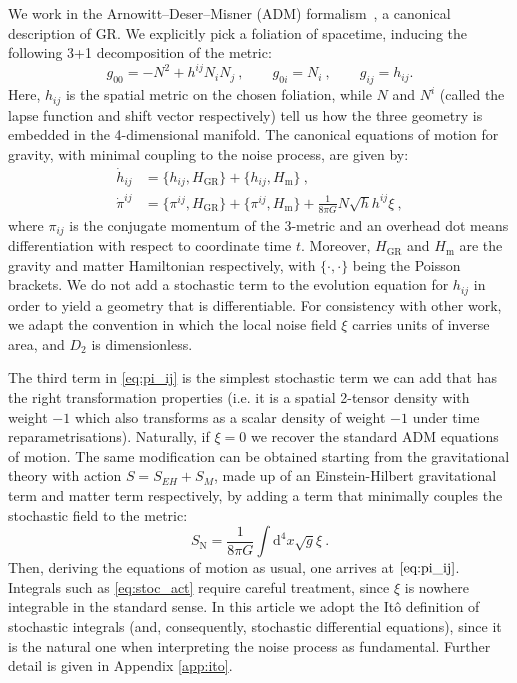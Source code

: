 \documentclass[amsmath,amssymb,11pt]{article}
\begin{document}
We work in the Arnowitt–Deser–Misner (ADM) formalism~\cite{arnowitt1959dynamical}, a canonical description of GR. We explicitly pick a foliation of spacetime, inducing the following 3+1 decomposition of the metric:
\begin{equation}
    g_{00}=-N^2+h^{ij}N_i N_j \ , \qquad g_{0i}=N_i \ , \qquad g_{ij}= h_{ij} .
\end{equation}
Here, $h_{ij}$ is the spatial metric on the chosen foliation, while $N$ and $N^i$ (called the lapse function and shift vector respectively) tell us how the three geometry is embedded in the 4-dimensional manifold. The canonical equations of motion for gravity, with minimal coupling to the noise process, are given by:
\begin{align}
    \dot{h}_{ij} &= \{h_{ij}, H_{\text{GR}}\}+ \{h_{ij}, H_{\text{m}} \}  \   ,\\
    \dot{\pi}^{ij} &= \{\pi^{ij}, H_{\text{GR}}\}+ \{\pi^{ij}, H_{\text{m}}\} +  \frac{1}{8\pi G}N\sqrt{h}h^{ij} \xi\ \label{eq:pi_ij}, 
\end{align} 
where $\pi_{ij}$ is the conjugate momentum of the 3-metric and an overhead dot means differentiation with respect to coordinate time $t$. Moreover, $H_{\text{GR}}$ and $H_{\text{m}}$ are the gravity and matter Hamiltonian respectively, with $\{\cdot,\cdot\}$ being the Poisson brackets. We do not add a stochastic term to the evolution equation for $h_{ij}$ in order to yield a geometry that is differentiable. For consistency with other work, we adapt the convention in which the local noise field $\xi$ carries units of inverse area, and $D_2$ is dimensionless.

The third term in \eqref{eq:pi_ij} is the simplest stochastic term we can add that has the right transformation properties (i.e. it is a spatial 2-tensor density with weight $-1$ which also transforms as a scalar density of weight $-1$ under time reparametrisations). Naturally, if $\xi=0$ we recover the standard ADM equations of motion. The same modification can be obtained starting from the gravitational theory with action $S=S_{EH}+S_M$, made up of an Einstein-Hilbert gravitational term and matter term respectively, by adding a term that minimally couples the stochastic field to the metric:
\begin{equation}
\label{eq:stoc_act}
    S_\text{N} = \frac{1}{8\pi G} \int \text{d}^4x \sqrt{g} \xi \ .
\end{equation}
Then, deriving the equations of motion as usual, one arrives at $\eqref{eq:pi_ij}$. Integrals such as \eqref{eq:stoc_act} require careful treatment, since $\xi$ is nowhere integrable in the standard sense. In this article we adopt the It\^{o} definition of stochastic integrals (and, consequently, stochastic differential equations), since it is the natural one when interpreting the noise process as fundamental. Further detail is given in Appendix \ref{app:ito}.
\end{document}
